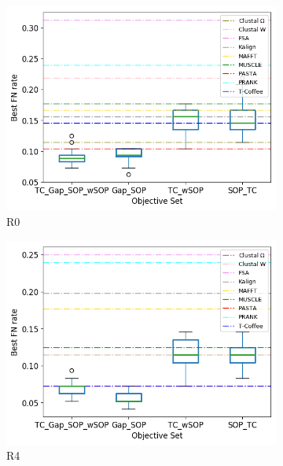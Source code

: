 \begin{figure}[!htbp]
	\centering
	\begin{adjustwidth}{-1cm}{-1cm}
	\begin{subfigure}{0.22\textwidth}
		\includegraphics[width=\columnwidth]{Figure/summary/precomputedInit/R0/objset_fnrate_rank}
		\caption{R0}
	\end{subfigure}	
	\begin{subfigure}{0.22\textwidth}
		\includegraphics[width=\columnwidth]{Figure/summary/precomputedInit/R4/objset_fnrate_rank}
		\caption{R4}
	\end{subfigure}
	\begin{subfigure}{0.22\textwidth}

\end{subfigure}
\end{adjustwidth}
\end{figure}
